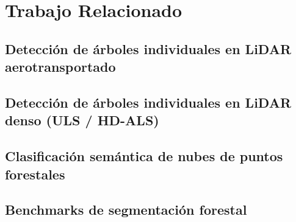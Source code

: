 \documentclass[runningheads]{llncs}
\begin{document}
\section{Trabajo Relacionado}\label{sec:related}

\subsection{Detecci\'on de \'arboles individuales en LiDAR aerotransportado}


\subsection{Detecci\'on de \'arboles individuales en LiDAR denso (ULS / HD-ALS)}


\subsection{Clasificaci\'on sem\'antica de nubes de puntos forestales}


\subsection{Benchmarks de segmentaci\'on forestal}
\end{document}
